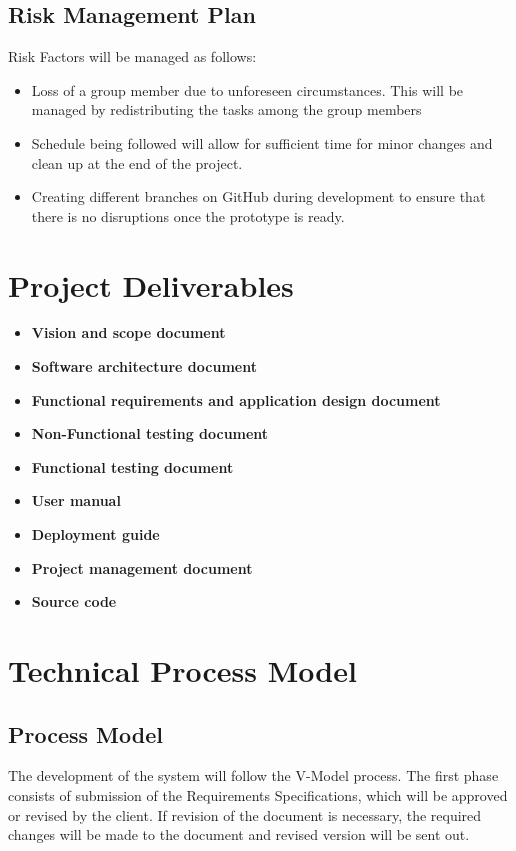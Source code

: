\documentclass[12pt]{article}
\begin{document}
\subsection{Risk Management Plan}
Risk Factors will be managed as follows:
\begin{itemize}
\item Loss of a group member due to unforeseen circumstances. This will be managed by redistributing the tasks among the group members
\item Schedule being followed will allow for sufficient time for minor changes and clean up at the end of the project.
\item Creating different branches on GitHub during development to ensure that there is no disruptions once the prototype is ready.
\end{itemize}
\newpage

\section{Project Deliverables}

\begin{itemize}
\item \textbf{Vision and scope document}
\item \textbf{Software architecture document}
\item \textbf{Functional requirements and application design document}
\item \textbf{Non-Functional testing document}
\item \textbf{Functional testing document}
\item \textbf{User manual}
\item \textbf{Deployment guide}
\item \textbf{Project management document}
\item \textbf{Source code}


\end{itemize}

\section{Technical Process Model}

\subsection{Process Model}
The development of the system will follow the V-Model process. The first phase consists of submission of the Requirements Specifications, which will be approved or revised by the client. If revision of the document is necessary, the required changes will be made to the document and revised version will be sent out.
\end{document}
